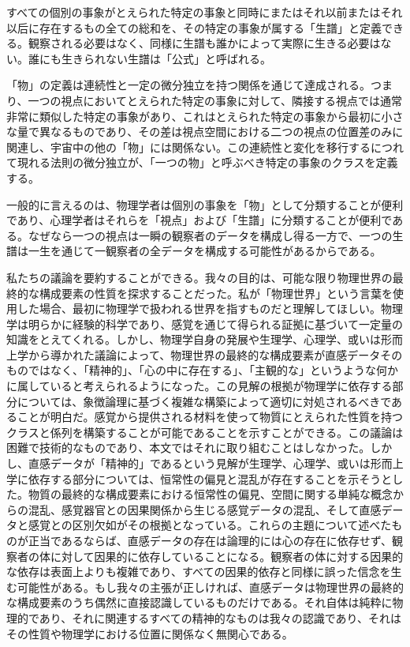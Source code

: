 \documentclass[a4paper,11pt,openany]{ltjsbook}
\begin{document}
すべての個別の事象がとえられた特定の事象と同時にまたはそれ以前またはそれ以后に存在するもの全ての総和を、その特定の事象が属する「生譜」と定義できる。観察される必要はなく、同様に生譜も誰かによって実際に生きる必要はない。誰にも生きられない生譜は「公式」と呼ばれる。

「物」の定義は連続性と一定の微分独立を持つ関係を通じて達成される。つまり、一つの視点においてとえられた特定の事象に対して、隣接する視点では通常非常に類似した特定の事象があり、これはとえられた特定の事象から最初に小さな量で異なるものであり、その差は視点空間における二つの視点の位置差のみに関連し、宇宙中の他の「物」には関係ない。この連続性と変化を移行するにつれて現れる法則の微分独立が、「一つの物」と呼ぶべき特定の事象のクラスを定義する。

一般的に言えるのは、物理学者は個別の事象を「物」として分類することが便利であり、心理学者はそれらを「視点」および「生譜」に分類することが便利である。なぜなら一つの視点は一瞬の観察者のデータを構成し得る一方で、一つの生譜は一生を通じて一観察者の全データを構成する可能性があるからである。

私たちの議論を要約することができる。我々の目的は、可能な限り物理世界の最終的な構成要素の性質を探求することだった。私が「物理世界」という言葉を使用した場合、最初に物理学で扱われる世界を指すものだと理解してほしい。物理学は明らかに経験的科学であり、感覚を通じて得られる証拠に基づいて一定量の知識をとえてくれる。しかし、物理学自身の発展や生理学、心理学、或いは形而上学から導かれた議論によって、物理世界の最終的な構成要素が直感データそのものではなく、「精神的」、「心の中に存在する」、「主観的な」というような何かに属していると考えられるようになった。この見解の根拠が物理学に依存する部分については、象徴論理に基づく複雑な構築によって適切に対処されるべきであることが明白だ。感覚から提供される材料を使って物質にとえられた性質を持つクラスと係列を構築することが可能であることを示すことができる。この議論は困難で技術的なものであり、本文ではそれに取り組むことはしなかった。しかし、直感データが「精神的」であるという見解が生理学、心理学、或いは形而上学に依存する部分については、恒常性の偏見と混乱が存在することを示そうとした。物質の最終的な構成要素における恒常性の偏見、空間に関する単純な概念からの混乱、感覚器官との因果関係から生じる感覚データの混乱、そして直感データと感覚との区別欠如がその根拠となっている。これらの主題について述べたものが正当であるならば、直感データの存在は論理的には心の存在に依存せず、観察者の体に対して因果的に依存していることになる。観察者の体に対する因果的な依存は表面上よりも複雑であり、すべての因果的依存と同様に誤った信念を生む可能性がある。もし我々の主張が正しければ、直感データは物理世界の最終的な構成要素のうち偶然に直接認識しているものだけである。それ自体は純粋に物理的であり、それに関連するすべての精神的なものは我々の認識であり、それはその性質や物理学における位置に関係なく無関心である。
\end{document}
